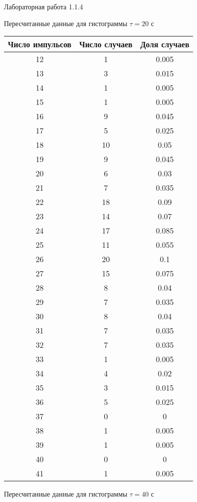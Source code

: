 \documentclass{astroedu-lab}
\begin{document}
\begin{problem}{\large Лабораторная работа 1.1.4}
\begin{center}
\newpage
Пересчитанные данные для гистограммы $\tau = 20$ с

\begin{tabular}[t]{|c|c|c|}
\hline
Число импульсов & Число случаев & Доля случаев \\
\hline
12 & 1 & 0.005\\
13 & 3 & 0.015\\
14 & 1 & 0.005\\
15 & 1 & 0.005\\
16 & 9 & 0.045\\
17 & 5 & 0.025\\
18 & 10 & 0.05\\
19 & 9 & 0.045\\
20 & 6 & 0.03\\
21 & 7 & 0.035\\
22 & 18 & 0.09\\
23 & 14 & 0.07\\
24 & 17 & 0.085\\
25 & 11 & 0.055\\
26 & 20 & 0.1\\
27 & 15 & 0.075\\
28 & 8 & 0.04\\
29 & 7 & 0.035\\
30 & 8 & 0.04\\
31 & 7 & 0.035\\
32 & 7 & 0.035\\
33 & 1 & 0.005\\
34 & 4 & 0.02\\
35 & 3 & 0.015\\
36 & 5 & 0.025\\
37 & 0 & 0\\
38 & 1 & 0.005\\
39 & 1 & 0.005\\
40 & 0 & 0\\
41 & 1 & 0.005\\
\hline
\end{tabular}
\end{center}

\begin{center}
Пересчитанные данные для гистограммы $\tau = 40$ с


\end{center}
\end{problem}
\end{document}
